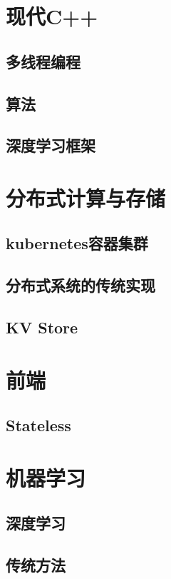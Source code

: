 \documentclass[11pt,oneside]{book}
\begin{document}


\tableofcontents

\chapter{现代C++}
\section{多线程编程}
\lipsum[1-2]

\section{算法}
\lipsum[1-2]

\section{深度学习框架}
\lipsum[1-2]


\chapter{分布式计算与存储}
\section{kubernetes容器集群}
\lipsum[1-3]

\section{分布式系统的传统实现}
\lipsum[1-2]

\section{KV Store}
\lipsum[1-2]



\chapter{前端}
\section{Stateless}
\lipsum[1-3]


\chapter{机器学习}
\section{深度学习}
\lipsum[1-3]

\section{传统方法}
\lipsum[1-1]


\end{document}
